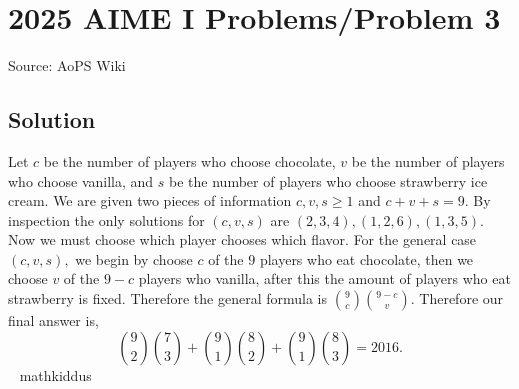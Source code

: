 \documentclass[12pt]{article}
\begin{document}
\section*{{2025 AIME I Problems/Problem 3}}
Source: AoPS Wiki

\subsection*{Solution}
Let $c$ be the number of players who choose chocolate, $v$ be the number of players who choose vanilla, and $s$ be the number of players who choose strawberry ice cream. We are given two pieces of information $c,v,s\ge 1$ and $c+v+s=9.$ By inspection the only solutions for $(c,v,s)$ are $(2,3,4),(1,2,6),(1,3,5).$ Now we must choose which player chooses which flavor. For the general case $(c,v,s),$ we begin by choose $c$ of the $9$ players who eat chocolate, then we choose $v$ of the $9-c$ players who vanilla, after this the amount of players who eat strawberry is fixed. Therefore the general formula is $\binom{9}{c}\binom{9-c}{v}.$ Therefore our final answer is, \[\binom{9}{2}\binom{7}{3}+\binom{9}{1}\binom{8}{2}+\binom{9}{1}\binom{8}{3}=2\boxed{016}.\] ~ mathkiddus
\end{document}
